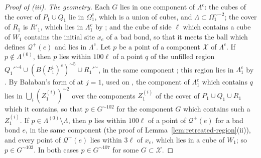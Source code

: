 \documentclass[11pt]{preprint}
\numberwithin{equation}{section}
\theoremstyle{definition}
\theoremstyle{remark}
\theoremstyle{plain}
\begin{document}
\begin{proof}[Proof of (iii)]
\emph{The geometry.} Each $G$ lies in one component of $\Lambda^c$: the cubes of the cover of $P_1 \cup Q_1$ lie in $\Omega_1^c$, which is a union of cubes, and $\Lambda \subset \Omega_1^{\sim-2}$; the cover of $R_1$ is $R'_1$, which lies in $\Lambda_1^c$ by \cite[(1.20)]{BalabanCRE}; and the cube of side $\ell$ which contains a cube of $W_1$ contains the initial site $x_e$ of a bad bond, so that it meets the ball which defines $\mathcal Q^+(e)$ and lies in $\Lambda^c$. Let $p$ be a point of a component $\mathcal X$ of $\Lambda^c$. If $p \notin \Lambda^{(0)}$, then $p$ lies within $100\ell$ of a point $q$ of the unfilled region $Q_1'^{\sim4} \cup (B(P_1^1)^c)^{\sim5} \cup R_1'^{\sim}$, in the same component \cite[Lemma~9.9(b)]{WilsonFirstStep}; this region lies in $\Lambda_1^c$ by \cite[(1.10), (1.20)]{BalabanCRE}. By Ba{\l}aban's form of \cite[(1.76), p.~381]{BalabanLFR2} at $j = 1$, used on \cite[p.~385, l.~15--16]{BalabanLFR2}, the component of $\Lambda_1^c$ which contains $q$ lies in $\bigcup_i(Z_1^{(i)})^{\sim2}$ over the components $Z_1^{(i)}$ of the cover of $P_1 \cup Q_1 \cup R_1$ which it contains, so that $p \in G^{\sim102}$ for the component $G$ which contains such a $Z_1^{(i)}$. If $p \in \Lambda^{(0)} \setminus \Lambda$, then $p$ lies within $100\ell$ of a point of $\mathcal Q^+(e)$ for a bad bond $e$, in the same component (the proof of Lemma~\ref{lem:retreated-region}(ii)), and every point of $\mathcal Q^+(e)$ lies within $3\ell$ of $x_e$, which lies in a cube of $W_1$; so $p \in G^{\sim103}$. In both cases $p \in G^{\sim107}$ for some $G \subset \mathcal X$.


\end{proof}
\end{document}
